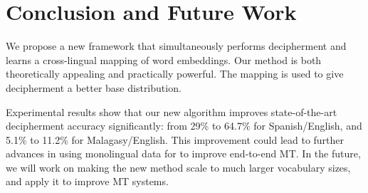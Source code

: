 \section{Conclusion and Future Work}

We propose a new framework that simultaneously performs decipherment and learns a cross-lingual mapping of word embeddings. Our method is both theoretically appealing and practically powerful. The mapping is used to give decipherment a better base distribution. 

Experimental results show that our new algorithm improves state-of-the-art decipherment accuracy significantly: from 29\% to 64.7\% for Spanish/English, and 5.1\% to 11.2\% for Malagasy/English. This improvement could lead to further advances in using monolingual data for to improve end-to-end MT.
In the future, we will work on making the new method scale to much larger vocabulary sizes, and apply it to improve MT systems.